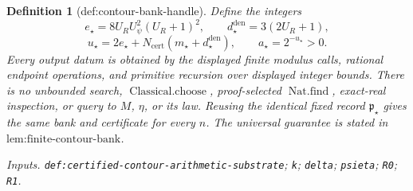 \documentclass{article}
\newtheorem{definition}{Definition}
\begin{document}
\begin{definition}[def:contour-bank-handle]
Define the integers
\[
 e_{\star}=8U_RU_{\psi}^2(U_R+1)^2,
 \qquad
 d_{\star}^{\mathrm{den}}=3(2U_R+1),
\]
\[
 u_{\star}=2e_{\star}
 +N_{\mathrm{cert}}(m_{\star}+d_{\star}^{\mathrm{den}}),
 \qquad
 a_{\star}=2^{-u_{\star}}>0.
\]
Every output datum is obtained by the displayed finite modulus calls, rational endpoint operations, and primitive recursion over displayed integer bounds.  There is no unbounded search, \(\operatorname{Classical.choose}\), proof-selected \(\operatorname{Nat.find}\), exact-real inspection, or query to \(M\), \(\eta\), or its law.  Reusing the identical fixed record \(\mathfrak p_{\star}\) gives the same bank and certificate for every \(n\).  The universal guarantee is stated in \(\text{lem:finite-contour-bank}\).
\par\smallskip\noindent\emph{Inputs.} \texttt{def:\allowbreak{}certified-\allowbreak{}contour-\allowbreak{}arithmetic-\allowbreak{}substrate}; \texttt{k}; \texttt{delta}; \texttt{psieta}; \texttt{R0}; \texttt{R1}.
\end{definition}
\end{document}
